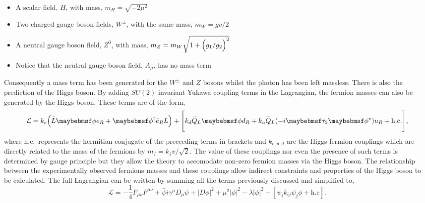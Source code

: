 \begin{itemize}
  \item A scalar field, $H$, with mass, $m_{H} = \sqrt{-2\mu^{2}}$
  \item Two charged gauge boson fields, $W^{\pm}$, with the same mass, $m_{W} = gv/2$
  \item A neutral gauge boson field, $Z^{0}$, with mass, $m_{Z} = m_{W}\sqrt{1+\Bigl(g_{1}/g_{2}\Bigr)^{2}}$
  \item Notice that the neutral gauge boson field, $A_{\mu}$, has no mass term
\end{itemize}

Consequently a mass term has been generated for the $W^{\pm}$ and $Z$ bosons whilst the photon has been left massless. There is also the prediction of the \SM Higgs boson. By adding $SU(2)$ invariant Yukawa coupling terms in the Lagrangian, the fermion masses can also be generated by the Higgs boson. These terms are of the form,
\begin{equation}
  \mathcal{L} = k_{e} \Bigl( \bar{L}\phi e_{R} + \phi^{\dagger}\bar{e}_{R} L \Bigr) + \Biggl[ k_{d}\bar{Q}_{L}\phi d_{R} + k_{u}\bar{Q}_{L}(-i\tau_{2}\phi^{\star})u_{R} + \mathrm{h.c.} \Bigg],
\end{equation}
where h.c.~represents the hermitian conjugate of the preceeding terms in brackets and $k_{e,u,d}$ are the Higgs-fermion couplings which are directly related to the mass of the fermions by $m_{f}=k_{f}v/\sqrt{2}$. The value of these couplings nor even the presence of such terms is determined by gauge principle but they allow the theory to accomodate non-zero fermion masses via the Higgs boson. The relationship between the experimentally observed fermions masses and these couplings allow indirect constraints and properties of the Higgs boson to be calculated. The full \SM Lagrangian can be written by summing all the terms previously discussed and simplified to,
\begin{equation}
  \mathcal{L} = -\frac{1}{4}F_{\mu\nu}F^{\mu\nu} + \bar{\psi}i\gamma^{\mu}D_{\mu}\psi + |D\phi|^{2} +\mu^{2}|\phi|^{2} -\lambda|\phi|^{2} + [ \psi_{i}k_{ij}\psi_{j}\phi + \mathrm{h.c} ].
\end{equation}


